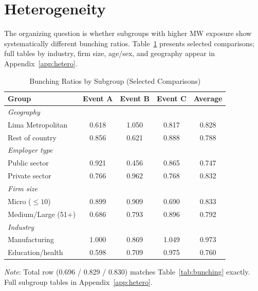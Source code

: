 \documentclass[12pt]{article}
\begin{document}
\section{Heterogeneity}\label{sec:heterogeneity}

The organizing question is whether subgroups with higher MW exposure show systematically different bunching ratios. Table~\ref{tab:hetero_summary} presents selected comparisons; full tables by industry, firm size, age/sex, and geography appear in Appendix~\ref{app:hetero}.

\begin{table}[H]
\centering
\caption{Bunching Ratios by Subgroup (Selected Comparisons)}
\label{tab:hetero_summary}
\begin{threeparttable}
\small
\begin{tabular}{lcccc}
\toprule
Group & Event A & Event B & Event C & Average \\
\midrule
\multicolumn{5}{l}{\textit{Geography}} \\
Lima Metropolitan & 0.618 & 1.050 & 0.817 & 0.828 \\
Rest of country & 0.856 & 0.621 & 0.888 & 0.788 \\[3pt]
\multicolumn{5}{l}{\textit{Employer type}} \\
Public sector & 0.921 & 0.456 & 0.865 & 0.747 \\
Private sector & 0.766 & 0.962 & 0.768 & 0.832 \\[3pt]
\multicolumn{5}{l}{\textit{Firm size}} \\
Micro ($\leq 10$) & 0.899 & 0.909 & 0.690 & 0.833 \\
Medium/Large (51+) & 0.686 & 0.793 & 0.896 & 0.792 \\[3pt]
\multicolumn{5}{l}{\textit{Industry}} \\
Manufacturing & 1.000 & 0.869 & 1.049 & 0.973 \\
Education/health & 0.598 & 0.709 & 0.975 & 0.760 \\
\bottomrule
\end{tabular}
\begin{tablenotes}
\small
\item \textit{Note}: Total row (0.696 / 0.829 / 0.830) matches Table~\ref{tab:bunching} exactly. Full subgroup tables in Appendix~\ref{app:hetero}.
\end{tablenotes}
\end{threeparttable}
\end{table}
\end{document}
